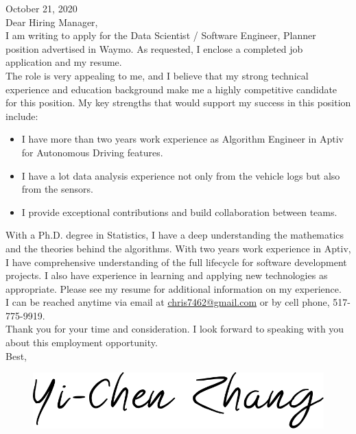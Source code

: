 \documentclass[a4paper,12pt,dvipdfmx]{article}
\begin{document}
\noindent October 21, 2020\\

\noindent Dear Hiring Manager,\\

\noindent I am writing to apply for the Data Scientist / Software Engineer, Planner position advertised in Waymo. As requested, I enclose a completed job application and my resume.\\

\noindent The role is very appealing to me, and I believe that my strong technical experience and education background make me a highly competitive candidate for this position. My key strengths that would support my success in this position include:
\begin{itemize}
  \item I have more than two years work experience as Algorithm Engineer in Aptiv for Autonomous Driving features.
  \item I have a lot data analysis experience not only from the vehicle logs but also from the sensors.
  \item I provide exceptional contributions and build collaboration between teams.
\end{itemize}

\noindent With a Ph.D. degree in Statistics, I have a deep understanding the mathematics and the theories behind the algorithms. With two years work experience in Aptiv, I have comprehensive understanding of the full lifecycle for software development projects. I also have experience in learning and applying new technologies as appropriate. Please see my resume for additional information on my experience.\\

\noindent I can be reached anytime via email at \href{mailto:chris7462@gmail.com}{chris7462@gmail.com} or by cell phone, 517-775-9919.\\

\noindent Thank you for your time and consideration. I look forward to speaking with you about this employment opportunity.\\

\noindent Best,

\begin{figure}[!ht]
  \includegraphics[scale=0.12]{./Signature.png}
\end{figure}
\end{document}
